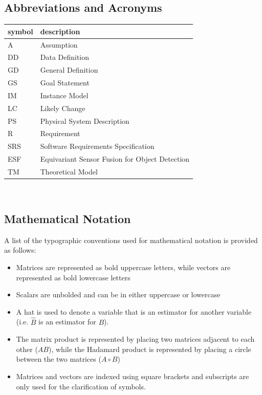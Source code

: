 \documentclass[12pt]{article}
\newcommand{\ProjectName}{ESF }
\begin{document}
\subsection{Abbreviations and Acronyms}

\renewcommand{\arraystretch}{1.2}
\begin{tabular}{l l} 
  \toprule		
  \textbf{symbol} & \textbf{description}\\
  \midrule 
  A & Assumption\\
  DD & Data Definition\\
  GD & General Definition\\
  GS & Goal Statement\\
  IM & Instance Model\\
  LC & Likely Change\\
  PS & Physical System Description\\
  R & Requirement\\
  SRS & Software Requirements Specification\\
  \ProjectName & Equivariant Sensor Fusion for Object Detection\\
  TM & Theoretical Model\\
  \bottomrule
\end{tabular}\\


\subsection{Mathematical Notation}
A list of the typographic conventions used for mathematical notation is provided as follows:
\begin{itemize}
  \item Matrices are represented as bold uppercase letters, while vectors are represented as bold lowercase letters
  \item Scalars are unbolded and can be in either uppercase or lowercase
  \item A hat is used to denote a variable that is an estimator for another variable (i.e. $\hat{B}$ is an estimator for $B$).
  \item The matrix product is represented by placing two matrices adjacent to each other ($AB$), while the Hadamard product is represented by placing a circle between the two matrices ($A\circ{}B$)
  \item Matrices and vectors are indexed using square brackets and subscripts are only used for the clarification of symbols. 
\end{itemize}
\end{document}
